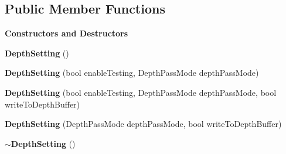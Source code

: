 \subsection*{Public Member Functions}
\begin{Indent}\textbf{ Constructors and Destructors}\par
\begin{DoxyCompactItemize}
\item 
\mbox{\label{classrev_1_1_depth_setting_a9193ec4b09cb6b789a34d57e11ad5987}} 
{\bfseries Depth\+Setting} ()
\item 
\mbox{\label{classrev_1_1_depth_setting_af4f79caae619b3d64d349e84a7775415}} 
{\bfseries Depth\+Setting} (bool enable\+Testing, Depth\+Pass\+Mode depth\+Pass\+Mode)
\item 
\mbox{\label{classrev_1_1_depth_setting_a77e0f178d67e45cc5331e3b1b940445b}} 
{\bfseries Depth\+Setting} (bool enable\+Testing, Depth\+Pass\+Mode depth\+Pass\+Mode, bool write\+To\+Depth\+Buffer)
\item 
\mbox{\label{classrev_1_1_depth_setting_acbc2dfafd3247d066278ff8eecb8f999}} 
{\bfseries Depth\+Setting} (Depth\+Pass\+Mode depth\+Pass\+Mode, bool write\+To\+Depth\+Buffer)
\item 
\mbox{\label{classrev_1_1_depth_setting_aac6e2965d3eff14f09a5068dba859bd3}} 
{\bfseries $\sim$\+Depth\+Setting} ()
\end{DoxyCompactItemize}
\end{Indent}
